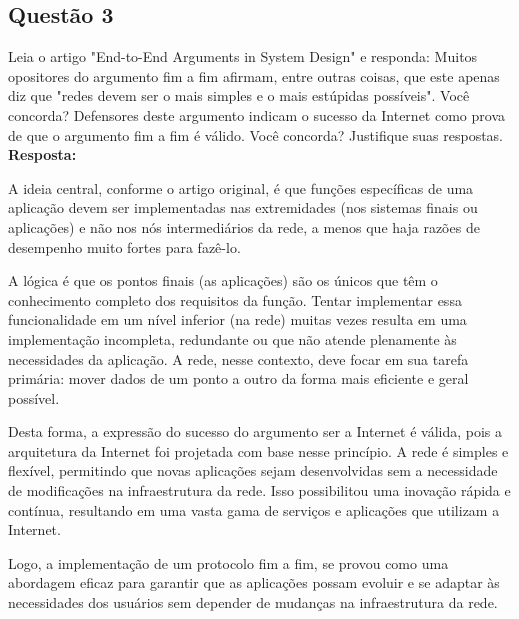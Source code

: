 \subsection{Questão 3}
Leia o artigo "End-to-End Arguments in System Design" e responda:
Muitos opositores do argumento fim a fim afirmam, entre outras coisas, que este
apenas diz que "redes devem ser o mais simples e o mais estúpidas possíveis".
Você concorda? Defensores deste argumento indicam o sucesso da Internet como
prova de que o argumento fim a fim é válido. Você concorda? Justifique suas
respostas.\\

\noindent
\textbf{Resposta:}

A ideia central, conforme o artigo original, é que funções específicas de uma aplicação devem ser implementadas nas extremidades (nos sistemas finais ou aplicações) e não nos nós intermediários da rede, a menos que haja razões de desempenho muito fortes para fazê-lo.

A lógica é que os pontos finais (as aplicações) são os únicos que têm o conhecimento completo dos requisitos da função. Tentar implementar essa funcionalidade em um nível inferior (na rede) muitas vezes resulta em uma implementação incompleta, redundante ou que não atende plenamente às necessidades da aplicação. A rede, nesse contexto, deve focar em sua tarefa primária: mover dados de um ponto a outro da forma mais eficiente e geral possível.

Desta forma, a expressão do sucesso do argumento ser a Internet é válida, pois a arquitetura da Internet foi projetada com base nesse princípio. A rede é simples e flexível, permitindo que novas aplicações sejam desenvolvidas sem a necessidade de modificações na infraestrutura da rede. Isso possibilitou uma inovação rápida e contínua, resultando em uma vasta gama de serviços e aplicações que utilizam a Internet.

Logo, a implementação de um protocolo fim a fim, se provou como uma abordagem eficaz para garantir que as aplicações possam evoluir e se adaptar às necessidades dos usuários sem depender de mudanças na infraestrutura da rede. 
